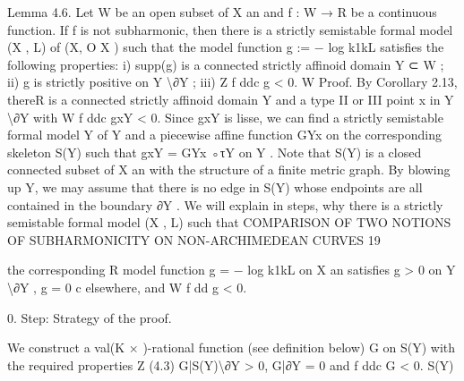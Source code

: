 \documentclass[
  10pt,
]{article}
\newenvironment{Shaded}{}{}
\newcommand{\NormalTok}[1]{#1}
\begin{document}
\begin{Shaded}
\begin{Highlighting}[]
\NormalTok{Lemma 4.6. Let W be an open subset of X an and f : W → R be a continuous function.}
\NormalTok{If f is not subharmonic, then there is a strictly semistable formal model (X , L) of (X, O X )}
\NormalTok{such that the model function g := − log k1kL satisfies the following properties:}
\NormalTok{      i) supp(g) is a connected strictly affinoid domain Y ⊂ W ;}
\NormalTok{     ii) g is strictly positive on Y \textbackslash{}∂Y ;}
\NormalTok{    iii)                                Z}
\NormalTok{                                               f ddc g \textless{} 0.}
\NormalTok{                                           W}
\NormalTok{Proof. By Corollary 2.13, thereR is a connected strictly affinoid domain Y and a type II}
\NormalTok{or III point x in Y \textbackslash{}∂Y with W f ddc gxY \textless{} 0. Since gxY is lisse, we can find a strictly}
\NormalTok{semistable formal model Y of Y and a piecewise affine function GYx on the corresponding}
\NormalTok{skeleton S(Y) such that gxY = GYx ◦τY on Y . Note that S(Y) is a closed connected subset}
\NormalTok{of X an with the structure of a finite metric graph. By blowing up Y, we may assume}
\NormalTok{that there is no edge in S(Y) whose endpoints are all contained in the boundary ∂Y . We}
\NormalTok{will explain in steps, why there is a strictly semistable formal model (X , L) such that}
\NormalTok{   COMPARISON OF TWO NOTIONS OF SUBHARMONICITY ON NON{-}ARCHIMEDEAN CURVES 19}


\NormalTok{the corresponding}
\NormalTok{               R model  function g = − log k1kL on X an satisfies g \textgreater{} 0 on Y \textbackslash{}∂Y , g = 0}
\NormalTok{                     c}
\NormalTok{elsewhere, and W f dd g \textless{} 0.}

\NormalTok{  0. Step: Strategy of the proof.}

\NormalTok{   We construct a val(K × ){-}rational function (see definition below) G on S(Y) with the}
\NormalTok{required properties}
\NormalTok{                                                    Z}
\NormalTok{(4.3)               G|S(Y)\textbackslash{}∂Y \textgreater{} 0, G|∂Y = 0 and           f ddc G \textless{} 0.}
\NormalTok{                                                           S(Y)}


\end{Highlighting}
\end{Shaded}
\end{document}
